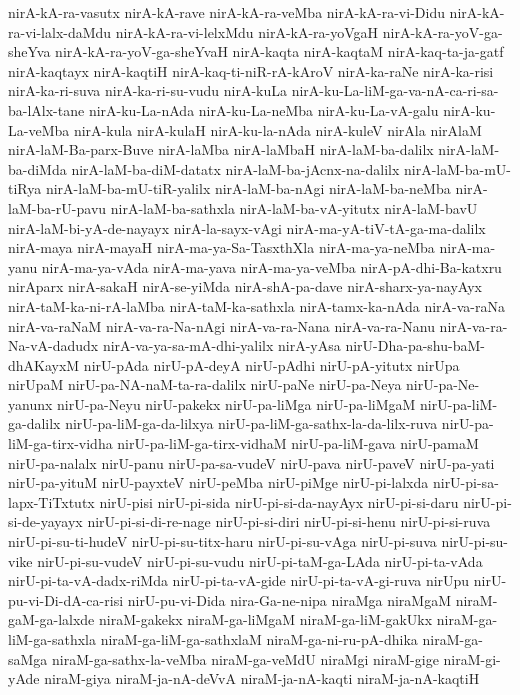 {nirA-kA-ra-vasutx
nirA-kA-rave
nirA-kA-ra-veMba
nirA-kA-ra-vi-Didu
nirA-kA-ra-vi-lalx-daMdu
nirA-kA-ra-vi-lelxMdu
nirA-kA-ra-yoVgaH
nirA-kA-ra-yoV-ga-sheYva
nirA-kA-ra-yoV-ga-sheYvaH
nirA-kaqta
nirA-kaqtaM
nirA-kaq-ta-ja-gatf
nirA-kaqtayx
nirA-kaqtiH
nirA-kaq-ti-niR-rA-kAroV
nirA-ka-raNe
nirA-ka-risi
nirA-ka-ri-suva
nirA-ka-ri-su-vudu
nirA-kuLa
nirA-ku-La-liM-ga-va-nA-ca-ri-sa-ba-lAlx-tane
nirA-ku-La-nAda
nirA-ku-La-neMba
nirA-ku-La-vA-galu
nirA-ku-La-veMba
nirA-kula
nirA-kulaH
nirA-ku-la-nAda
nirA-kuleV
nirAla
nirAlaM
nirA-laM-Ba-parx-Buve
nirA-laMba
nirA-laMbaH
nirA-laM-ba-dalilx
nirA-laM-ba-diMda
nirA-laM-ba-diM-datatx
nirA-laM-ba-jAcnx-na-dalilx
nirA-laM-ba-mU-tiRya
nirA-laM-ba-mU-tiR-yalilx
nirA-laM-ba-nAgi
nirA-laM-ba-neMba
nirA-laM-ba-rU-pavu
nirA-laM-ba-sathxla
nirA-laM-ba-vA-yitutx
nirA-laM-bavU
nirA-laM-bi-yA-de-nayayx
nirA-la-sayx-vAgi
nirA-ma-yA-tiV-tA-ga-ma-dalilx
nirA-maya
nirA-mayaH
nirA-ma-ya-Sa-TasxthXla
nirA-ma-ya-neMba
nirA-ma-yanu
nirA-ma-ya-vAda
nirA-ma-yava
nirA-ma-ya-veMba
nirA-pA-dhi-Ba-katxru
nirAparx
nirA-sakaH
nirA-se-yiMda
nirA-shA-pa-dave
nirA-sharx-ya-nayAyx
nirA-taM-ka-ni-rA-laMba
nirA-taM-ka-sathxla
nirA-tamx-ka-nAda
nirA-va-raNa
nirA-va-raNaM
nirA-va-ra-Na-nAgi
nirA-va-ra-Nana
nirA-va-ra-Nanu
nirA-va-ra-Na-vA-dadudx
nirA-va-ya-sa-mA-dhi-yalilx
nirA-yAsa
nirU-Dha-pa-shu-baM-dhAKayxM
nirU-pAda
nirU-pA-deyA
nirU-pAdhi
nirU-pA-yitutx
nirUpa
nirUpaM
nirU-pa-NA-naM-ta-ra-dalilx
nirU-paNe
nirU-pa-Neya
nirU-pa-Ne-yanunx
nirU-pa-Neyu
nirU-pakekx
nirU-pa-liMga
nirU-pa-liMgaM
nirU-pa-liM-ga-dalilx
nirU-pa-liM-ga-da-lilxya
nirU-pa-liM-ga-sathx-la-da-lilx-ruva
nirU-pa-liM-ga-tirx-vidha
nirU-pa-liM-ga-tirx-vidhaM
nirU-pa-liM-gava
nirU-pamaM
nirU-pa-nalalx
nirU-panu
nirU-pa-sa-vudeV
nirU-pava
nirU-paveV
nirU-pa-yati
nirU-pa-yituM
nirU-payxteV
nirU-peMba
nirU-piMge
nirU-pi-lalxda
nirU-pi-sa-lapx-TiTxtutx
nirU-pisi
nirU-pi-sida
nirU-pi-si-da-nayAyx
nirU-pi-si-daru
nirU-pi-si-de-yayayx
nirU-pi-si-di-re-nage
nirU-pi-si-diri
nirU-pi-si-henu
nirU-pi-si-ruva
nirU-pi-su-ti-hudeV
nirU-pi-su-titx-haru
nirU-pi-su-vAga
nirU-pi-suva
nirU-pi-su-vike
nirU-pi-su-vudeV
nirU-pi-su-vudu
nirU-pi-taM-ga-LAda
nirU-pi-ta-vAda
nirU-pi-ta-vA-dadx-riMda
nirU-pi-ta-vA-gide
nirU-pi-ta-vA-gi-ruva
nirUpu
nirU-pu-vi-Di-dA-ca-risi
nirU-pu-vi-Dida
nira-Ga-ne-nipa
niraMga
niraMgaM
niraM-gaM-ga-lalxde
niraM-gakekx
niraM-ga-liMgaM
niraM-ga-liM-gakUkx
niraM-ga-liM-ga-sathxla
niraM-ga-liM-ga-sathxlaM
niraM-ga-ni-ru-pA-dhika
niraM-ga-saMga
niraM-ga-sathx-la-veMba
niraM-ga-veMdU
niraMgi
niraM-gige
niraM-gi-yAde
niraM-giya
niraM-ja-nA-deVvA
niraM-ja-nA-kaqti
niraM-ja-nA-kaqtiH
}
